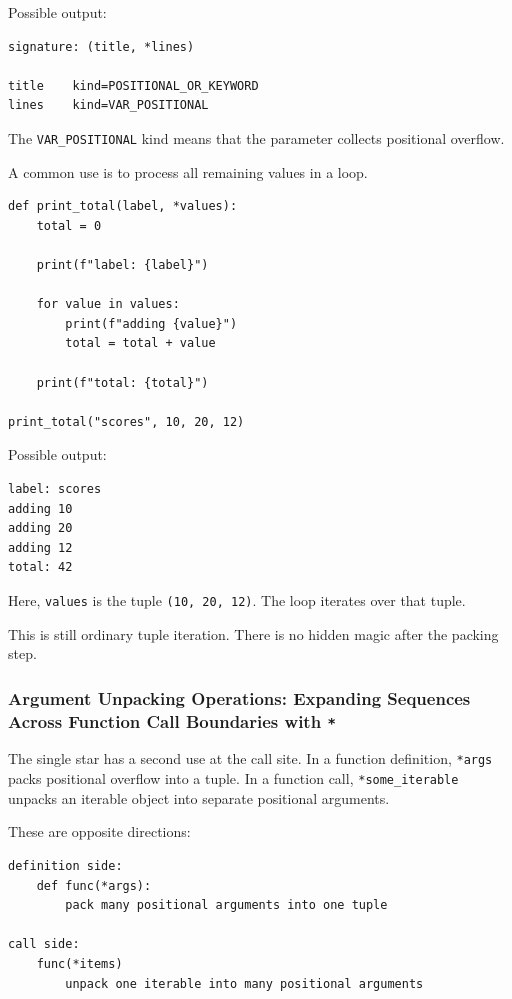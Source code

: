 Possible output:

\begin{verbatim}
signature: (title, *lines)

title    kind=POSITIONAL_OR_KEYWORD
lines    kind=VAR_POSITIONAL
\end{verbatim}

The \texttt{VAR\_POSITIONAL} kind means that the parameter collects positional overflow.

A common use is to process all remaining values in a loop.

\begin{verbatim}
def print_total(label, *values):
    total = 0

    print(f"label: {label}")

    for value in values:
        print(f"adding {value}")
        total = total + value

    print(f"total: {total}")

print_total("scores", 10, 20, 12)
\end{verbatim}

Possible output:

\begin{verbatim}
label: scores
adding 10
adding 20
adding 12
total: 42
\end{verbatim}

Here, \texttt{values} is the tuple \texttt{(10, 20, 12)}. The loop iterates over that tuple.

This is still ordinary tuple iteration. There is no hidden magic after the packing step.

\subsubsection{Argument Unpacking Operations: Expanding Sequences Across Function Call Boundaries with \texttt{*}}

The single star has a second use at the call site. In a function definition, \texttt{*args} packs positional overflow into a tuple. In a function call, \texttt{*some\_iterable} unpacks an iterable object into separate positional arguments.

These are opposite directions:

\begin{verbatim}
definition side:
    def func(*args):
        pack many positional arguments into one tuple

call side:
    func(*items)
        unpack one iterable into many positional arguments
\end{verbatim}

